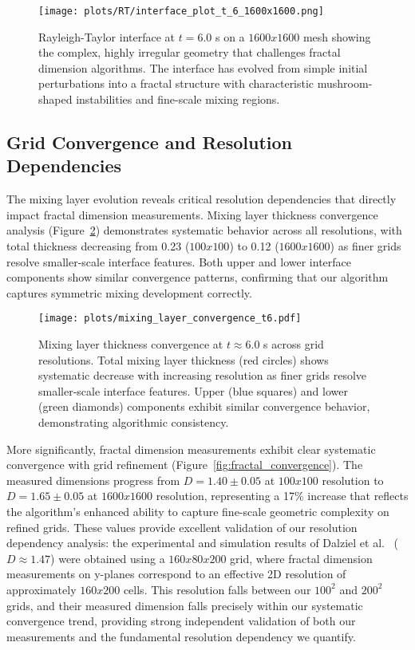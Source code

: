 \documentclass[preprint,12pt]{elsarticle}
\def\times{x}%
\begin{document}
\begin{figure}[htb]
\centering
\texttt{[image: plots/RT/interface\_plot\_t\_6\_1600x1600.png]}
\caption{Rayleigh-Taylor interface at $t = 6.0$ s on a $1600 \times 1600$ mesh showing the complex, highly irregular geometry that challenges fractal dimension algorithms. The interface has evolved from simple initial perturbations into a fractal structure with characteristic mushroom-shaped instabilities and fine-scale mixing regions.}
\label{fig:rt_interface_t6}
\end{figure}

\subsection{Grid Convergence and Resolution Dependencies}
\label{subsec:grid_convergence}

The mixing layer evolution reveals critical resolution dependencies that directly impact fractal dimension measurements. Mixing layer thickness convergence analysis (Figure~\ref{fig:mixing_convergence}) demonstrates systematic behavior across all resolutions, with total thickness decreasing from 0.23 ($100 \times 100$) to 0.12 ($1600 \times 1600$) as finer grids resolve smaller-scale interface features. Both upper and lower interface components show similar convergence patterns, confirming that our algorithm captures symmetric mixing development correctly.

\begin{figure}[htb]
\centering
\texttt{[image: plots/mixing\_layer\_convergence\_t6.pdf]}
\caption{Mixing layer thickness convergence at $t \approx 6.0$ s across grid resolutions. Total mixing layer thickness (red circles) shows systematic decrease with increasing resolution as finer grids resolve smaller-scale interface features. Upper (blue squares) and lower (green diamonds) components exhibit similar convergence behavior, demonstrating algorithmic consistency.}
\label{fig:mixing_convergence}
\end{figure}

More significantly, fractal dimension measurements exhibit clear systematic convergence with grid refinement (Figure~\ref{fig:fractal_convergence}). The measured dimensions progress from $D = 1.40 \pm 0.05$ at $100 \times 100$ resolution to $D = 1.65 \pm 0.05$ at $1600 \times 1600$ resolution, representing a 17\% increase that reflects the algorithm's enhanced ability to capture fine-scale geometric complexity on refined grids. These values provide excellent validation of our resolution dependency analysis: the experimental and simulation results of Dalziel et al.~\cite{dalziel1999} ($D \approx 1.47$) were obtained using a $160 \times 80 \times 200$ grid, where fractal dimension measurements on y-planes correspond to an effective 2D resolution of approximately $160 \times 200$ cells. This resolution falls between our $100^2$ and $200^2$ grids, and their measured dimension falls precisely within our systematic convergence trend, providing strong independent validation of both our measurements and the fundamental resolution dependency we quantify.
\end{document}
